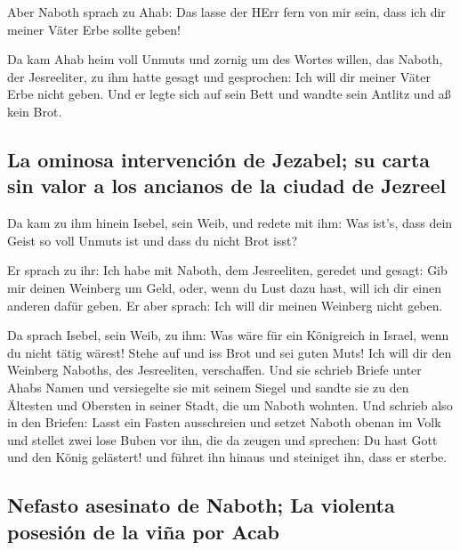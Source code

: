  Aber Naboth sprach zu Ahab: Das lasse der HErr fern von
mir sein, dass ich dir meiner Väter Erbe sollte geben!

 Da kam Ahab heim voll Unmuts und zornig um des Wortes
willen, das Naboth, der Jesreeliter, zu ihm hatte gesagt und gesprochen:
Ich will dir meiner Väter Erbe nicht geben. Und er legte sich auf sein
Bett und wandte sein Antlitz und aß kein Brot.

\hypertarget{la-ominosa-intervenciuxf3n-de-jezabel-su-carta-sin-valor-a-los-ancianos-de-la-ciudad-de-jezreel}{%
\subsection{La ominosa intervención de Jezabel; su carta sin valor a los
ancianos de la ciudad de
Jezreel}\label{la-ominosa-intervenciuxf3n-de-jezabel-su-carta-sin-valor-a-los-ancianos-de-la-ciudad-de-jezreel}}

 Da kam zu ihm hinein Isebel, sein Weib, und redete mit
ihm: Was ist's, dass dein Geist so voll Unmuts ist und dass du nicht
Brot isst?

 Er sprach zu ihr: Ich habe mit Naboth, dem Jesreeliten,
geredet und gesagt: Gib mir deinen Weinberg um Geld, oder, wenn du Lust
dazu hast, will ich dir einen anderen dafür geben. Er aber sprach: Ich
will dir meinen Weinberg nicht geben.

 Da sprach Isebel, sein Weib, zu ihm: Was wäre für ein
Königreich in Israel, wenn du nicht tätig wärest! Stehe auf und iss Brot
und sei guten Muts! Ich will dir den Weinberg Naboths, des Jesreeliten,
verschaffen.  Und sie schrieb Briefe unter Ahabs Namen und
versiegelte sie mit seinem Siegel und sandte sie zu den Ältesten und
Obersten in seiner Stadt, die um Naboth wohnten.  Und
schrieb also in den Briefen: Lasst ein Fasten ausschreien und setzet
Naboth obenan im Volk  und stellet zwei lose Buben vor
ihn, die da zeugen und sprechen: Du hast Gott und den König gelästert!
und führet ihn hinaus und steiniget ihn, dass er sterbe.

\hypertarget{nefasto-asesinato-de-naboth-la-violenta-posesiuxf3n-de-la-viuxf1a-por-acab}{%
\subsection{Nefasto asesinato de Naboth; La violenta posesión de la viña
por
Acab}\label{nefasto-asesinato-de-naboth-la-violenta-posesiuxf3n-de-la-viuxf1a-por-acab}}

